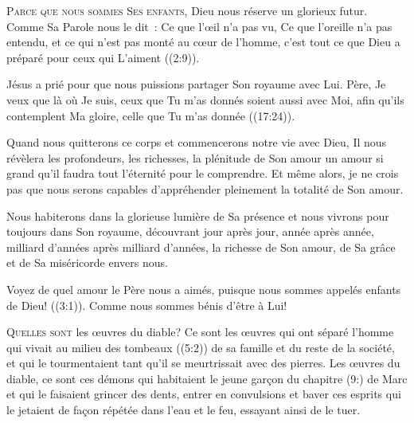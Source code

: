 \lettrine{P}{arce que nous sommes Ses enfants,}
 Dieu nous réserve un glorieux futur.
 Comme Sa Parole nous le dit~: 
 \og Ce que l'œil n'a pas vu, Ce que l'oreille n'a pas entendu,
 et ce qui n'est pas monté au cœur de l'homme,
 c'est tout ce que Dieu a préparé pour ceux qui L'aiment \fg{}
 ((2:9)). 

Jésus a prié pour que nous puissions partager Son royaume avec Lui.
 \og Père, Je veux que là où Je suis, ceux que Tu m'as donnés
 soient aussi avec Moi, afin qu'ils contemplent Ma gloire,
 celle que Tu m'as donnée \fg{} ((17:24)). 


Quand nous quitterons ce corps et commencerons notre vie avec Dieu,
 Il nous révèlera les profondeurs, les richesses, la plénitude de Son amour
 \ocadr un amour si grand qu'il faudra tout l'éternité pour le comprendre.
 Et même alors, je ne crois pas que nous serons capables d'appréhender
 pleinement la totalité de Son amour. 

Nous habiterons dans la glorieuse lumière de Sa présence et nous vivrons
 pour toujours dans Son royaume, découvrant jour après jour,
 année après année, milliard d'années après milliard d'années,
 la richesse de Son amour, de Sa grâce et de Sa miséricorde envers nous. 

\og Voyez de quel amour le Père nous a aimés, puisque nous sommes appelés
 enfants de Dieu! \fg{} ((3:1)).
 Comme nous sommes bénis d'être à Lui! 

\dvrule






\lettrine{Q}{uelles sont} les œuvres du diable?
 Ce sont les œuvres qui ont séparé l'homme qui vivait
 au milieu des tombeaux ((5:2)) de sa famille
 et du reste de la société, et qui le tourmentaient tant
 qu'il se meurtrissait avec des pierres.
 Les œuvres du diable, ce sont ces démons qui habitaient le jeune garçon
 du chapitre (9:) de Marc et qui le faisaient grincer des dents,
 entrer en convulsions et baver \ocadr ces esprits qui le jetaient
 de façon répétée dans l'eau et le feu, essayant ainsi de le tuer. 

